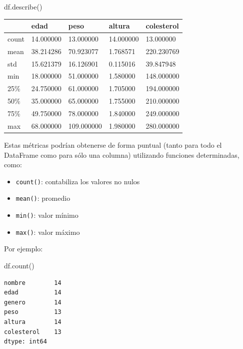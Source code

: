 \documentclass[
  letterpaper,
  DIV=11,
  numbers=noendperiod]{scrreprt}
\newenvironment{Shaded}{\begin{snugshade}}{\end{snugshade}}
\newcommand{\NormalTok}[1]{\textcolor[rgb]{0.00,0.23,0.31}{#1}}
\providecommand{\tightlist}{%
  \setlength{\itemsep}{0pt}\setlength{\parskip}{0pt}}\usepackage{longtable,booktabs,array}
\begin{document}
\begin{Shaded}
\begin{Highlighting}[]
\NormalTok{df.describe()}
\end{Highlighting}
\end{Shaded}

\begin{longtable}[]{@{}lllll@{}}
\toprule\noalign{}
& edad & peso & altura & colesterol \\
\midrule\noalign{}
\endhead
\bottomrule\noalign{}
\endlastfoot
count & 14.000000 & 13.000000 & 14.000000 & 13.000000 \\
mean & 38.214286 & 70.923077 & 1.768571 & 220.230769 \\
std & 15.621379 & 16.126901 & 0.115016 & 39.847948 \\
min & 18.000000 & 51.000000 & 1.580000 & 148.000000 \\
25\% & 24.750000 & 61.000000 & 1.705000 & 194.000000 \\
50\% & 35.000000 & 65.000000 & 1.755000 & 210.000000 \\
75\% & 49.750000 & 78.000000 & 1.840000 & 249.000000 \\
max & 68.000000 & 109.000000 & 1.980000 & 280.000000 \\
\end{longtable}

Estas métricas podrían obtenerse de forma puntual (tanto para todo el
DataFrame como para sólo una columna) utilizando funciones determinadas,
como:\\

\begin{itemize}
\tightlist
\item
  \texttt{count()}: contabiliza los valores no nulos
\item
  \texttt{mean()}: promedio
\item
  \texttt{min()}: valor mínimo
\item
  \texttt{max()}: valor máximo
\end{itemize}

Por ejemplo:

\begin{Shaded}
\begin{Highlighting}[]
\NormalTok{df.count()}
\end{Highlighting}
\end{Shaded}

\begin{verbatim}
nombre        14
edad          14
genero        14
peso          13
altura        14
colesterol    13
dtype: int64
\end{verbatim}
\end{document}
